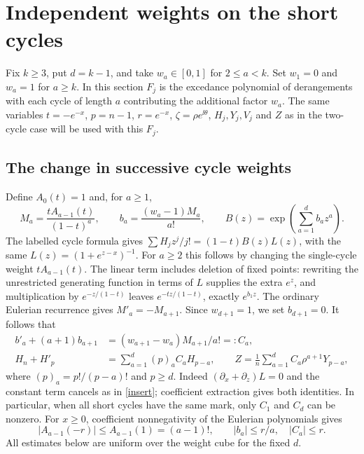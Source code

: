 \section{Independent weights on the short cycles}\label{sec:general}
Fix \(k\ge3\), put \(d=k-1\), and take \(w_a\in[0,1]\) for \(2\le a<k\). Set \(w_1=0\) and \(w_a=1\) for \(a\ge k\). In this section \(F_j\) is the excedance polynomial of derangements with each cycle of length \(a\) contributing the additional factor \(w_a\). The same variables \(t=-e^{-x}\), \(p=n-1\), \(r=e^{-x}\), \(\zeta=\rho e^{\ii\theta}\), \(H_j,Y_j,V_j\) and \(Z\) as in the two-cycle case will be used with this \(F_j\).

\subsection{The change in successive cycle weights}
Define \(A_0(t)=1\) and, for \(a\ge1\),
\[
 M_a=\frac{tA_{a-1}(t)}{(1-t)^a},\qquad
 b_a=\frac{(w_a-1)M_a}{a!},\qquad
 B(z)=\exp\!\left(\sum_{a=1}^{d} b_a z^a\right).
\]
The labelled cycle formula gives \(\sum H_jz^j/j!=(1-t)B(z)L(z)\), with the same \(L(z)=(1+e^{z-x})^{-1}\). For \(a\ge2\) this follows by changing the single-cycle weight \(tA_{a-1}(t)\). The linear term includes deletion of fixed points: rewriting the unrestricted generating function in terms of \(L\) supplies the extra \(e^z\), and multiplication by \(e^{-z/(1-t)}\) leaves \(e^{-tz/(1-t)}\), exactly \(e^{b_1z}\). The ordinary Eulerian recurrence gives \(M'_a=-M_{a+1}\). Since \(w_{d+1}=1\), we set \(b_{d+1}=0\). It follows that
\begin{align}
 b'_a+(a+1)b_{a+1}&=(w_{a+1}-w_a)M_{a+1}/a! =: C_a,\\
 H_n+H'_p&=\sum_{a=1}^{d}(p)_a C_a H_{p-a},\qquad
 Z=\frac1n\sum_{a=1}^{d}C_a\rho^{a+1}Y_{p-a},\label{general-insertion}
\end{align}
where \((p)_a=p!/(p-a)!\) and \(p\ge d\). Indeed \((\partial_x+\partial_z)L=0\) and the constant term cancels as in \eqref{insert}; coefficient extraction gives both identities. In particular, when all short cycles have the same mark, only \(C_1\) and \(C_d\) can be nonzero. For \(x\ge0\), coefficient nonnegativity of the Eulerian polynomials gives
\[
 |A_{a-1}(-r)|\le A_{a-1}(1)=(a-1)!,\qquad
 |b_a|\le r/a,\quad |C_a|\le r.
\]
All estimates below are uniform over the weight cube for the fixed \(d\).

